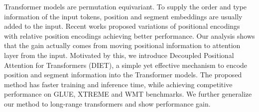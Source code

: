 Transformer models are permutation equivariant. To supply the order and type information of the input tokens, position and segment embeddings are usually added to the input. Recent works proposed variations of positional encodings with relative position encodings achieving better performance. Our analysis shows that the gain actually comes from moving positional information to attention layer from the input. Motivated by this, we introduce Decoupled Positional Attention for Transformers (DIET), a simple yet effective mechanism to encode position and segment information into the Transformer models. The proposed method has faster training and inference time, while achieving competitive performance on GLUE, XTREME and WMT benchmarks. We further generalize our method to long-range transformers and show performance gain.
